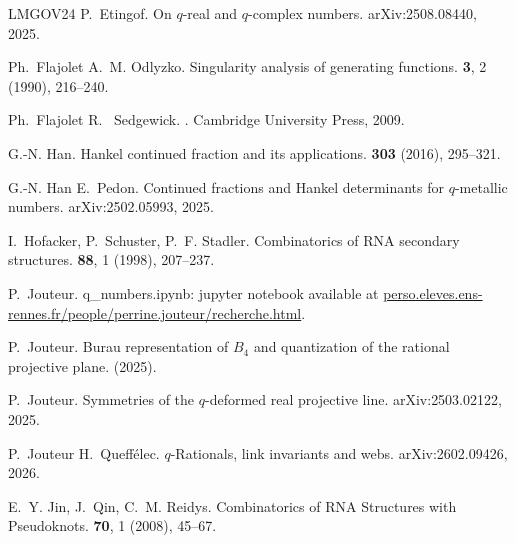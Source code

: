 \documentclass[11pt,reqno]{amsart}
\theoremstyle{plain}
\theoremstyle{definition}
\numberwithin{figure}{section}
\numberwithin{table}{section}
\numberwithin{equation}{section}
\begin{document}
\begin{thebibliography}{LMGOV24}
P.~\bgroup\sc Etingof\egroup{}.
\newblock On $q$-real and $q$-complex numbers.
\newblock arXiv{\string:}2508.08440, 2025.

{\relax Ph}.~\bgroup\sc Flajolet\egroup{} \andname{} A.~M. \bgroup\sc
  Odlyzko\egroup{}.
\newblock Singularity analysis of generating functions.
 {\bf 3}, 2 (1990), 216--240.

{\relax Ph}.~\bgroup\sc Flajolet\egroup{} \andname{} R.~\bgroup\sc
  Sedgewick\egroup{}.
.
\newblock Cambridge University Press, 2009.

G.-N. \bgroup\sc Han\egroup{}.
\newblock Hankel continued fraction and its applications.
 {\bf 303} (2016), 295--321.

G.-N. \bgroup\sc Han\egroup{} \andname{} E.~\bgroup\sc Pedon\egroup{}.
\newblock Continued fractions and Hankel determinants for $q$-metallic numbers.
\newblock arXiv{\string:}2502.05993, 2025.

I.~\bgroup\sc Hofacker\egroup{}, P.~\bgroup\sc Schuster\egroup{}, \andname{}
  P.~F. \bgroup\sc Stadler\egroup{}.
\newblock Combinatorics of RNA secondary structures.
 {\bf 88}, 1 (1998), 207--237.

P.~\bgroup\sc Jouteur\egroup{}.
\newblock q\_numbers.ipynb: jupyter notebook available at
  \url{perso.eleves.ens-rennes.fr/people/perrine.jouteur/recherche.html}.

P.~\bgroup\sc Jouteur\egroup{}.
\newblock Burau representation of {$B_4$ }and quantization of the rational
  projective plane.
  (2025).

P.~\bgroup\sc Jouteur\egroup{}.
\newblock Symmetries of the $q$-deformed real projective line.
\newblock arXiv{\string:}2503.02122, 2025.

P.~\bgroup\sc Jouteur\egroup{} \andname{} H.~\bgroup\sc Queff{\'e}lec\egroup{}.
\newblock $q$-Rationals, link invariants and webs.
\newblock arXiv{\string:}2602.09426, 2026.

E.~Y. \bgroup\sc Jin\egroup{}, J.~\bgroup\sc Qin\egroup{}, \andname{} C.~M.
  \bgroup\sc Reidys\egroup{}.
\newblock Combinatorics of RNA Structures with Pseudoknots.
 {\bf 70}, 1 (2008), 45--67.


\end{thebibliography}
\end{document}
